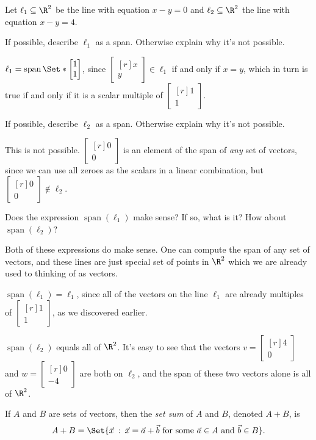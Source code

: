 \documentclass{problemset}
\DeclareMathOperator{\Span}{span}
\newcommand{\mat}[1]{\begin{bmatrix*}[r]#1\end{bmatrix*}}
\providecommand\given{}
\newcommand\SetSymbol[1][]{%
	\nonscript\::%
	\allowbreak
	\nonscript\:
	\mathopen{}}
\renewcommand\given{\SetSymbol[\delimsize]}
\begin{document}
	\question
	\label{linesAsSpans}
	Let $\ell_1\subseteq \R^2$ be the line with equation $x-y=0$ and $\ell_2\subseteq\R^2$
	the line with equation $x-y=4$.
	\begin{parts}
		\item If possible, describe $\ell_1$ as a span. Otherwise explain why 
			it's not possible.
			\begin{solution}
				$\ell_1 = \Span\Set*{\mat{1\\1}}$, since $\mat{x\\y} \in \ell_1$ 
				if and only if $x = y$, which in turn is true if and only if it 
				is a scalar multiple of $\mat{1\\1}$. 
			\end{solution}
		\item If possible, describe $\ell_2$ as a span. Otherwise explain why it's 
			not possible.
			\label{linesAsSpans.2}
			\begin{solution}
				This is not possible. $\mat{0\\0}$ is an element of	the span of 
				\emph{any} set of vectors, since we can use all zeroes as the 
				scalars in a linear combination, but $\mat{0\\0} \notin \ell_2$.
			\end{solution}
		\item Does the expression $\Span(\ell_1)$ make sense? If so, what is it? 
			How about $\Span(\ell_2)$?
			\begin{solution}
				Both of these expressions do make sense. One can compute the span
				of any set of vectors, and these lines are just special set of 
				points in $\R^2$ which we are already used to thinking of as vectors.

				$\Span(\ell_1) = \ell_1$, since all of the vectors on 
				the line $\ell_1$ are already multiples of $\mat{1\\1}$, as we 
				discovered earlier. 

				$\Span(\ell_2)$ equals all of $\R^2$. It's easy to see that the 
				vectors $v = \mat{4\\0}$ and $w = \mat{0\\-4}$ are both on $\ell_2$, 
				and the span of these two vectors alone is all of $\R^2$. 
			\end{solution}
	\end{parts}


	\begin{definition}
		If $A$ and $B$ are sets of vectors, then the \emph{set sum} of $A$
		and $B$, denoted $A+B$, is
		\[
			A+B=\Set{\vec x \given \vec x=\vec a+\vec b\text{ for some }\vec a\in A\text{ and }
			\vec b\in B}.
		\]
	\end{definition}
\end{document}
